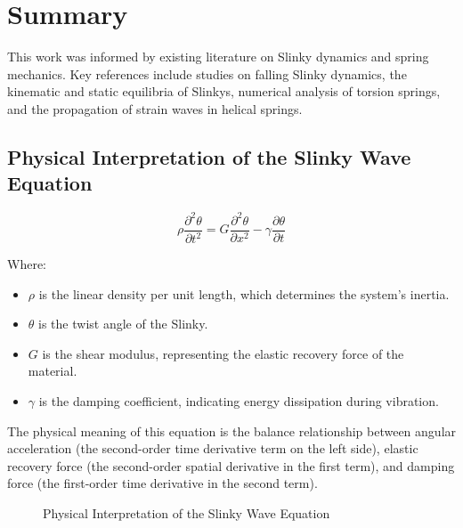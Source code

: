 \documentclass{mcmthesis}  %
\begin{document}
\section{Summary}  %

This work was informed by existing literature on Slinky dynamics and spring mechanics. Key references include studies on falling Slinky dynamics\cite{falling-slinky}, the kinematic and static equilibria of Slinkys\cite{kinematics-slinky}, numerical analysis of torsion springs\cite{torsion-springs}, and the propagation of strain waves in helical springs\cite{strain-waves-numerical, strain-waves-cylindrical}.

\printbibliography  %


\begin{appendices}  %

\section{Physical Interpretation of the Slinky Wave Equation}  %

\begin{equation}
\rho\frac{\partial^2 \theta}{\partial t^2} = G\frac{\partial^2 \theta}{\partial x^2} - \gamma \frac{\partial \theta}{\partial t}
\end{equation}

Where:
\begin{itemize}
    \item $\rho$ is the linear density per unit length, which determines the system's inertia.
    \item $\theta$ is the twist angle of the Slinky.
    \item $G$ is the shear modulus, representing the elastic recovery force of the material.
    \item $\gamma$ is the damping coefficient, indicating energy dissipation during vibration.
\end{itemize}

The physical meaning of this equation is the balance relationship between angular acceleration (the second-order time derivative term on the left side), elastic recovery force (the second-order spatial derivative in the first term), and damping force (the first-order time derivative in the second term).

\begin{figure}[h!]
    \centering
    \caption{Physical Interpretation of the Slinky Wave Equation}
    \label{fig:wave_equation_interpretation}
\end{figure}


\end{appendices}
\end{document}
